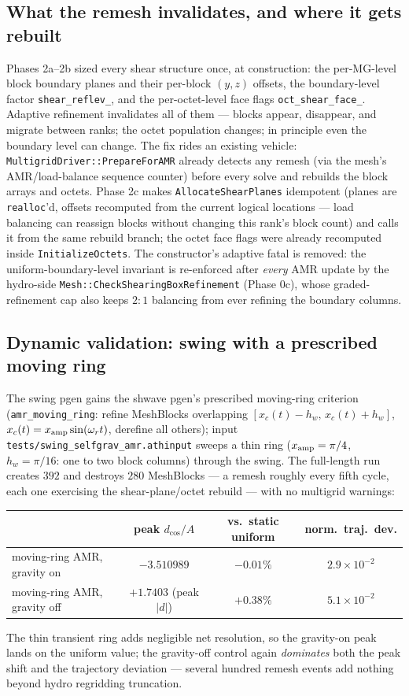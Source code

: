 \documentclass[11pt]{article}
\newcommand{\code}[1]{\texttt{#1}}
\begin{document}
\subsection{What the remesh invalidates, and where it gets rebuilt}
Phases 2a--2b sized every shear structure once, at construction: the per-MG-level
block boundary planes and their per-block $(y,z)$ offsets, the boundary-level
factor \code{shear\_reflev\_}, and the per-octet-level face flags
\code{oct\_shear\_face\_}. Adaptive refinement invalidates all of them --- blocks
appear, disappear, and migrate between ranks; the octet population changes; in
principle even the boundary level can change. The fix rides an existing vehicle:
\code{MultigridDriver::PrepareForAMR} already detects any remesh (via the
mesh's AMR/load-balance sequence counter) before every solve and rebuilds the
block arrays and octets. Phase 2c makes \code{AllocateShearPlanes} idempotent
(planes are \code{realloc}'d, offsets recomputed from the current logical
locations --- load balancing can reassign blocks without changing this rank's
block count) and calls it from the same rebuild branch; the octet face flags
were already recomputed inside \code{InitializeOctets}. The constructor's
adaptive fatal is removed: the uniform-boundary-level invariant is re-enforced
after \emph{every} AMR update by the hydro-side
\code{Mesh::CheckShearingBoxRefinement} (Phase 0c), whose graded-refinement cap
also keeps $2{:}1$ balancing from ever refining the boundary columns.

\subsection{Dynamic validation: swing with a prescribed moving ring}
\label{sec:p2c_swing}
The swing pgen gains the shwave pgen's prescribed moving-ring criterion
(\code{amr\_moving\_ring}: refine MeshBlocks overlapping
$[x_c(t)-h_w,\,x_c(t)+h_w]$, $x_c(t) = x_{\rm amp}\sin(\omega_r t)$, derefine all
others); input \code{tests/swing\_selfgrav\_amr.athinput} sweeps a thin ring
($x_{\rm amp}=\pi/4$, $h_w=\pi/16$: one to two block columns) through the swing.
The full-length run creates $392$ and destroys $280$ MeshBlocks --- a remesh
roughly every fifth cycle, each one exercising the shear-plane/octet rebuild ---
with no multigrid warnings:
\begin{center}
\small
\begin{tabular}{@{}lccc@{}}
\toprule
 & peak $d_{\cos}/A$ & vs.\ static uniform & norm.\ traj.\ dev. \\
\midrule
moving-ring AMR, gravity on  & $-3.510989$ & $-0.01\%$ & $2.9\times10^{-2}$ \\
moving-ring AMR, gravity off & $+1.7403$ (peak $|d|$)   & $+0.38\%$ & $5.1\times10^{-2}$ \\
\bottomrule
\end{tabular}
\end{center}
The thin transient ring adds negligible net resolution, so the gravity-on peak
lands on the uniform value; the gravity-off control again \emph{dominates} both
the peak shift and the trajectory deviation --- several hundred remesh events
add nothing beyond hydro regridding truncation.
\end{document}
